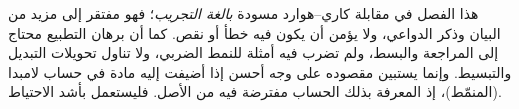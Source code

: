 \documentclass[../../../include/open-logic-chapter]{subfiles}
\begin{document}

\begin{editorial}
  هذا الفصل في مقابلة كاري--هوارد مسودة \emph{بالغة التجريب}؛ فهو مفتقر
  إلى مزيد من البيان وذكر الدواعي، ولا يؤمن أن يكون فيه خطأ أو نقص. كما أن
  برهان التطبيع محتاج إلى المراجعة والبسط، ولم تضرب فيه أمثلة للنمط
  الضربي، ولا تناول تحويلات التبديل والتبسيط. وإنما يستبين مقصوده على وجه
  أحسن إذا أضيفت إليه مادة في حساب لامبدا (المنمّط)، إذ المعرفة بذلك الحساب
  مفترضة فيه من الأصل. فليستعمل بأشد الاحتياط.
\end{editorial}


\OLEndChapterHook
\end{document}

